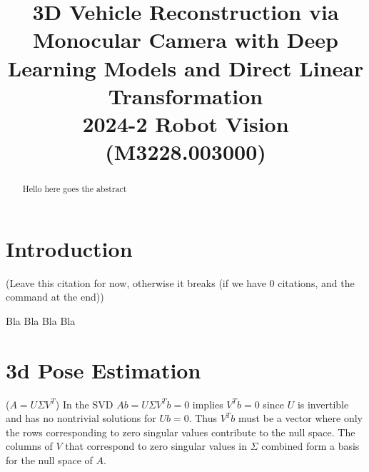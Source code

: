 \documentclass[conference]{IEEEtran}
\begin{document}
\title{3D Vehicle Reconstruction via Monocular Camera with Deep Learning Models and Direct Linear Transformation\\
{\footnotesize 2024-2 Robot Vision (M3228.003000)}
}

\author{
    \and
    \and
}

\maketitle

\begin{abstract}
    Hello here goes the abstract
\end{abstract}

\section{Introduction}
\begin{center}
    \cite{main-article}
    (Leave this citation for now, otherwise it breaks (if we have 0 citations, and the command at the end))
\end{center}

Bla Bla Bla Bla

\section{3d Pose Estimation}
\setcounter{MaxMatrixCols}{20}

($A = U\Sigma V^{T}$)
\cite{SVD}
In the SVD $Ab = U\Sigma V^{T}b = 0$ implies $V^{T}b = 0$ since $U$ is invertible and has no nontrivial solutions for $Ub = 0$.
Thus $V^{T}b$ must be a vector where only the rows corresponding to zero singular values contribute to the null space.
The columns of $V$ that correspond to zero singular values in $\Sigma$ combined form a basis for the null space of $A$.
\end{document}
